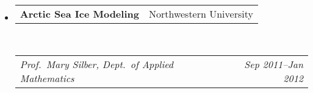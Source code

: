 \documentclass[10pt,letterpaper]{article}
\makeatletter
\newcommand{\headerrow}[2]
{\begin{tabular*}{\linewidth}{l@{\extracolsep{\fill}}r}
	#1 &
	#2 \\
\end{tabular*}}
\makeatother
\begin{document}
\begin{itemize}
\begin{itemize*}
	\end{itemize*}
	\item
	\headerrow
		{\textbf{Arctic Sea Ice Modeling}}
		{Northwestern University}	\\
	\headerrow
		{\emph{Prof.~Mary Silber, Dept.~of Applied Mathematics}}
		{\emph{Sep 2011--Jan 2012}}

	

\end{itemize}
\end{document}
